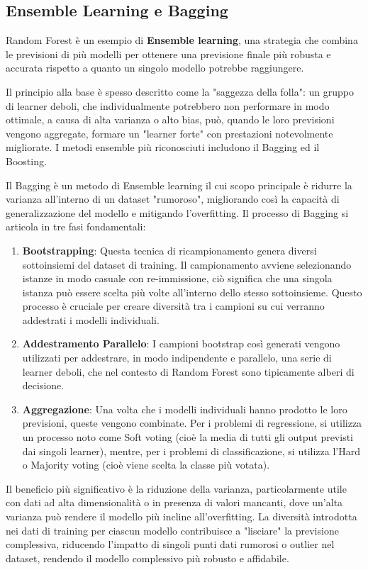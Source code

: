 \documentclass[a4paper,12pt]{report}
\begin{document}
	\subsection{Ensemble Learning e Bagging}
	
	Random Forest è un esempio di \textbf{Ensemble learning}, una strategia che combina le previsioni di più modelli per ottenere una previsione finale più robusta e accurata rispetto a quanto un singolo modello potrebbe raggiungere.
	
	Il principio alla base è spesso descritto come la "saggezza della folla": un gruppo di learner deboli, che individualmente potrebbero non performare in modo ottimale, a causa di alta varianza o alto bias, può, quando le loro previsioni vengono aggregate, formare un "learner forte" con prestazioni notevolmente migliorate. I metodi ensemble più riconosciuti includono il Bagging ed il Boosting.
	
	Il Bagging è un metodo di Ensemble learning il cui scopo principale è ridurre la varianza all'interno di un dataset "rumoroso", migliorando così la capacità di generalizzazione del modello e mitigando l'overfitting. Il processo di Bagging si articola in tre fasi fondamentali:
	\begin{enumerate}
		\item \textbf{Bootstrapping}: Questa tecnica di ricampionamento genera diversi sottoinsiemi del dataset di training. Il campionamento avviene selezionando istanze in modo casuale con re-immissione, ciò significa che una singola istanza può essere scelta più volte all'interno dello stesso sottoinsieme. Questo processo è cruciale per creare diversità tra i campioni su cui verranno addestrati i modelli individuali.
		\item \textbf{Addestramento Parallelo}: I campioni bootstrap così generati vengono utilizzati per addestrare, in modo indipendente e parallelo, una serie di learner deboli, che nel contesto di Random Forest sono tipicamente alberi di decisione.
		\item \textbf{Aggregazione}: Una volta che i modelli individuali hanno prodotto le loro previsioni, queste vengono combinate. Per i problemi di regressione, si utilizza un processo noto come Soft voting (cioè la media di tutti gli output previsti dai singoli learner), mentre, per i problemi di classificazione, si utilizza l'Hard o Majority voting (cioè viene scelta la classe più votata).
	\end{enumerate}
	
	Il beneficio più significativo è la riduzione della varianza, particolarmente utile con dati ad alta dimensionalità o in presenza di valori mancanti, dove un'alta varianza può rendere il modello più incline all'overfitting. La diversità introdotta nei dati di training per ciascun modello contribuisce a "lisciare" la previsione complessiva, riducendo l'impatto di singoli punti dati rumorosi o outlier nel dataset, rendendo il modello complessivo più robusto e affidabile.
	
\end{document}
